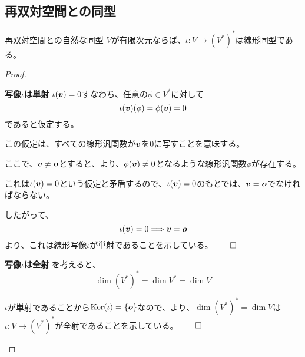\documentclass[../../../topic_linear-algebra]{subfiles}
\begin{document}
\subsection{再双対空間との同型}

\begin{theorem*}{再双対空間との自然な同型}
  $V$が有限次元ならば、$\iota \colon V \to (V^*)^*$は線形同型である。
\end{theorem*}

\begin{proof}
  \begin{subpattern}{\bfseries 写像$\iota$は単射}
    $\iota(\vb*{v}) = 0$すなわち、任意の$\phi \in V^*$に対して
    \begin{equation*}
      \iota(\vb*{v})(\phi) = \phi(\vb*{v}) = 0
    \end{equation*}
    であると仮定する。
    
    この仮定は、すべての線形汎関数が$\vb*{v}$を0に写すことを意味する。
    
    \br

    ここで、$\vb*{v} \neq \vb*{o}$とすると、より、$\phi(\vb*{v}) \neq 0$となるような線形汎関数$\phi$が存在する。

    これは$\iota(\vb*{v}) = 0$という仮定と矛盾するので、$\iota(\vb*{v}) = 0$のもとでは、$\vb*{v} = \vb*{o}$でなければならない。
    
    \br
    
    したがって、
    \begin{equation*}
      \iota(\vb*{v}) = 0 \Longrightarrow \vb*{v} = \vb*{o}
    \end{equation*}
    より、これは線形写像$\iota$が単射であることを示している。$\qed$
  \end{subpattern}
  
  \begin{subpattern}{\bfseries 写像$\iota$は全射}
    を考えると、
    \begin{equation*}
      \dim (V^*)^* = \dim V^* = \dim V
    \end{equation*}

    $\iota$が単射であることから$\operatorname{Ker}(\iota) = \{ \vb*{o} \}$なので、より、$\dim (V^*)^* = \dim V$は$\iota \colon V \to (V^*)^*$が全射であることを示している。$\qed$
  \end{subpattern}
\end{proof}
\end{document}

